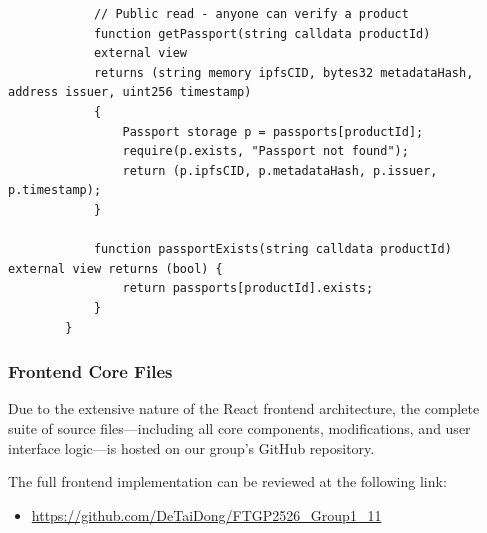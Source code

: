 \documentclass[runningheads]{llncs}
\begin{document}
\begin{lstlisting}
			// Public read - anyone can verify a product
			function getPassport(string calldata productId)
			external view
			returns (string memory ipfsCID, bytes32 metadataHash, address issuer, uint256 timestamp)
			{
				Passport storage p = passports[productId];
				require(p.exists, "Passport not found");
				return (p.ipfsCID, p.metadataHash, p.issuer, p.timestamp);
			}
			
			function passportExists(string calldata productId) external view returns (bool) {
				return passports[productId].exists;
			}
		}
	\end{lstlisting}

	\subsubsection{Frontend Core Files}
	
	Due to the extensive nature of the React frontend architecture, the complete suite of source files---including all core components, modifications, and user interface logic---is hosted on our group's GitHub repository. 
	
	The full frontend implementation can be reviewed at the following link:
	\begin{itemize}
		\item \url{https://github.com/DeTaiDong/FTGP2526_Group1_11}
	\end{itemize}
	
	
	
	
	
	
	
\end{document}
